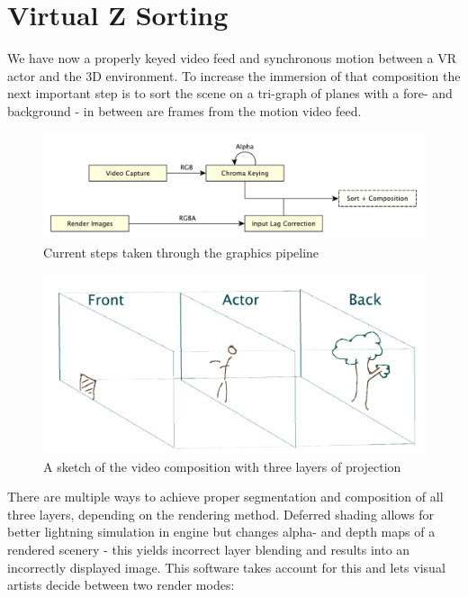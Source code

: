 %
\section{Virtual Z Sorting}

We have now a properly keyed video feed and synchronous motion between a VR 
actor and the 3D environment. To increase the immersion of that composition the 
next important step is to sort the scene on a tri-graph of planes with a fore- 
and background - in between are frames from the motion video feed.

\begin{figure}[htb]
	\includegraphics[width=\textwidth]{_raw_resources/pipeline_steps/4_5_composition.pdf}
	\caption{Current steps taken through the graphics pipeline}
	\label{fig:steps:composition}
\end{figure}

\begin{figure}[htb]
	\includegraphics[width=\textwidth]{_raw_resources/composition/Composition-TriGraph.png}
	\caption{A sketch of the video composition with three layers of projection}
	\label{fig:zsort:sketch}
\end{figure}

There are multiple ways to achieve proper segmentation and composition of all 
three layers, depending on the rendering method. Deferred shading allows for 
better lightning simulation in engine but changes alpha- and depth maps of a 
rendered scenery - this yields incorrect layer blending and results into an 
incorrectly displayed image. This software takes account for this and lets 
visual artists decide between two render modes:

